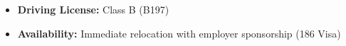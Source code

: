 \documentclass[10pt,a4paper,ragged2e,withhyper]{altacv}
\begin{document}
\begin{paracol}{2}

	\begin{itemize}
	  \item \textbf{Driving License:} Class B (B197)
	  \item \textbf{Availability:} Immediate relocation with employer sponsorship (186 Visa)
	\end{itemize}




	\switchcolumn


	
	

	{\LaTeXraggedright
		\par}

	\vspace{1.2em}

	{\LaTeXraggedright
		\par}

	\vspace{1.2em}

	{\LaTeXraggedright
		\par}

	\vspace{1.2em}


\end{paracol}
\end{document}

